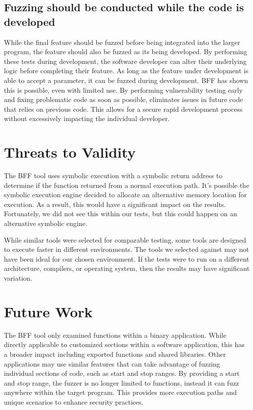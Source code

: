 \documentclass[conference]{IEEEtran}
\begin{document}
\subsection{Fuzzing should be conducted while the code is developed}
While the final feature should be fuzzed before being integrated into the larger program, the feature should also be fuzzed as its being developed. By performing these tests during development, the software developer can alter their underlying logic before completing their feature. As long as the feature under development is able to accept a parameter, it can be fuzzed during development. BFF has shown this is possible, even with limited use. By performing vulnerability testing early and fixing problematic code as soon as possible, eliminates issues in future code that relies on previous code. This allows for a secure rapid development process without excessively impacting the individual developer. 
 

\section{Threats to Validity}
The BFF tool uses symbolic execution with a symbolic return address to determine if the function returned from a normal execution path. It's possible the symbolic execution engine decided to allocate an alternative memory location for execution. As a result, this would have a significant impact on the results. Fortunately, we did not see this within our tests, but this could happen on an alternative symbolic engine. 

While similar tools were selected for comparable testing, some tools are designed to execute faster in different environments. The tools we selected against may not have been ideal for our chosen environment. If the tests were to run on a different architecture, compilers, or operating system, then the results may have significant variation. 

\section{Future Work}
The BFF tool only examined functions within a binary application. While directly applicable to customized sections within a software application, this has a broader impact including exported functions and shared libraries. Other applications may use similar features that can take advantage of fuzzing individual sections of code, such as start and stop ranges. By providing a start and stop range, the fuzzer is no longer limited to functions, instead it can fuzz anywhere within the target program. This provides more execution paths and unique scenarios to enhance security practices. 
\end{document}
